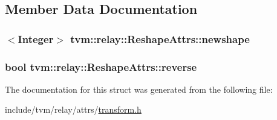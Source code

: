 \subsection{Member Data Documentation}
\subsubsection[{\texorpdfstring{newshape}{newshape}}]{$<${\bf Integer}$>$ tvm\+::relay\+::\+Reshape\+Attrs\+::newshape}\hypertarget{structtvm_1_1relay_1_1ReshapeAttrs_a9bca32c3acff2ed8fd6bc63a50f82051}{}\label{structtvm_1_1relay_1_1ReshapeAttrs_a9bca32c3acff2ed8fd6bc63a50f82051}
\subsubsection[{\texorpdfstring{reverse}{reverse}}]{\setlength{\rightskip}{0pt plus 5cm}bool tvm\+::relay\+::\+Reshape\+Attrs\+::reverse}\hypertarget{structtvm_1_1relay_1_1ReshapeAttrs_a02ca8a36e60dfcd523df035af8b6c006}{}\label{structtvm_1_1relay_1_1ReshapeAttrs_a02ca8a36e60dfcd523df035af8b6c006}


The documentation for this struct was generated from the following file\+:\begin{DoxyCompactItemize}
\item 
include/tvm/relay/attrs/\hyperlink{include_2tvm_2relay_2attrs_2transform_8h}{transform.\+h}\end{DoxyCompactItemize}
